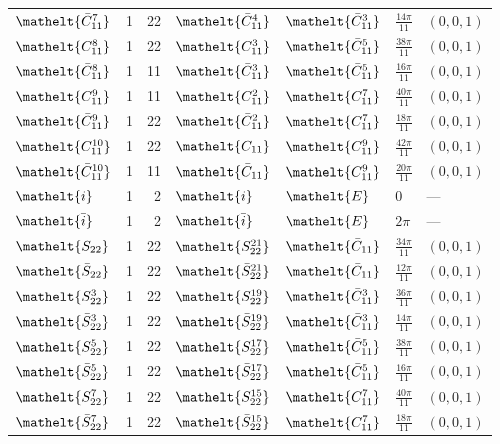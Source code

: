 \documentclass[10pt,a4paper]{article}
\numberwithin{equation}{section}
\newcommand{\eltfont}[1]{{\let\sigma\eltsigma\mathelt{#1}}}
\newcommand{\cls}[1]{\eltfont{#1}}
\newcommand{\dirvec}[3]{(#1, #2, #3)}
\newcommand{\barred}[1]{\bar{#1}}
\begin{document}
{\begin{longtable}{@{}lrrllll@{}}
$\cls{\barred{C}_{11}^{7}}$ & 1 & 22 & $\cls{\barred{C}_{11}^{4}}$ & $\cls{\barred{C}_{11}^{3}}$ & $\tfrac{14\pi}{11}$ & $\dirvec{0}{0}{1}$\\
$\cls{C_{11}^{8}}$ & 1 & 22 & $\cls{C_{11}^{3}}$ & $\cls{\barred{C}_{11}^{5}}$ & $\tfrac{38\pi}{11}$ & $\dirvec{0}{0}{1}$\\
$\cls{\barred{C}_{11}^{8}}$ & 1 & 11 & $\cls{\barred{C}_{11}^{3}}$ & $\cls{\barred{C}_{11}^{5}}$ & $\tfrac{16\pi}{11}$ & $\dirvec{0}{0}{1}$\\
$\cls{C_{11}^{9}}$ & 1 & 11 & $\cls{C_{11}^{2}}$ & $\cls{C_{11}^{7}}$ & $\tfrac{40\pi}{11}$ & $\dirvec{0}{0}{1}$\\
$\cls{\barred{C}_{11}^{9}}$ & 1 & 22 & $\cls{\barred{C}_{11}^{2}}$ & $\cls{C_{11}^{7}}$ & $\tfrac{18\pi}{11}$ & $\dirvec{0}{0}{1}$\\
$\cls{C_{11}^{10}}$ & 1 & 22 & $\cls{C_{11}}$ & $\cls{C_{11}^{9}}$ & $\tfrac{42\pi}{11}$ & $\dirvec{0}{0}{1}$\\
$\cls{\barred{C}_{11}^{10}}$ & 1 & 11 & $\cls{\barred{C}_{11}}$ & $\cls{C_{11}^{9}}$ & $\tfrac{20\pi}{11}$ & $\dirvec{0}{0}{1}$\\
$\cls{i}$ & 1 & 2 & $\cls{i}$ & $\cls{E}$ & $0$ & ---\\
$\cls{\barred{i}}$ & 1 & 2 & $\cls{\barred{i}}$ & $\cls{E}$ & $2\pi$ & ---\\
$\cls{S_{22}}$ & 1 & 22 & $\cls{S_{22}^{21}}$ & $\cls{\barred{C}_{11}}$ & $\tfrac{34\pi}{11}$ & $\dirvec{0}{0}{1}$\\
$\cls{\barred{S}_{22}}$ & 1 & 22 & $\cls{\barred{S}_{22}^{21}}$ & $\cls{\barred{C}_{11}}$ & $\tfrac{12\pi}{11}$ & $\dirvec{0}{0}{1}$\\
$\cls{S_{22}^{3}}$ & 1 & 22 & $\cls{S_{22}^{19}}$ & $\cls{\barred{C}_{11}^{3}}$ & $\tfrac{36\pi}{11}$ & $\dirvec{0}{0}{1}$\\
$\cls{\barred{S}_{22}^{3}}$ & 1 & 22 & $\cls{\barred{S}_{22}^{19}}$ & $\cls{\barred{C}_{11}^{3}}$ & $\tfrac{14\pi}{11}$ & $\dirvec{0}{0}{1}$\\
$\cls{S_{22}^{5}}$ & 1 & 22 & $\cls{S_{22}^{17}}$ & $\cls{\barred{C}_{11}^{5}}$ & $\tfrac{38\pi}{11}$ & $\dirvec{0}{0}{1}$\\
$\cls{\barred{S}_{22}^{5}}$ & 1 & 22 & $\cls{\barred{S}_{22}^{17}}$ & $\cls{\barred{C}_{11}^{5}}$ & $\tfrac{16\pi}{11}$ & $\dirvec{0}{0}{1}$\\
$\cls{S_{22}^{7}}$ & 1 & 22 & $\cls{S_{22}^{15}}$ & $\cls{C_{11}^{7}}$ & $\tfrac{40\pi}{11}$ & $\dirvec{0}{0}{1}$\\
$\cls{\barred{S}_{22}^{7}}$ & 1 & 22 & $\cls{\barred{S}_{22}^{15}}$ & $\cls{C_{11}^{7}}$ & $\tfrac{18\pi}{11}$ & $\dirvec{0}{0}{1}$\\

\end{longtable}}
\end{document}
